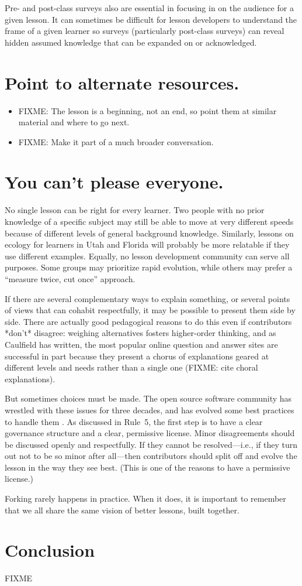 \documentclass[10pt,letterpaper]{article}
\newcommand{\rulemajor}[1]{\section{#1}}
\begin{document}
Pre- and post-class surveys also are essential in focusing in on the audience for a given lesson.
It can sometimes be difficult for lesson developers to understand the frame of a given learner
so surveys (particularly post-class surveys) can reveal hidden assumed knowledge
that can be expanded on or acknowledged.

\rulemajor{Point to alternate resources.}

\begin{itemize}

\item
  FIXME: The lesson is a beginning, not an end, so point them at similar material and where to go next.

\item
  FIXME: Make it part of a much broader conversation.

\end{itemize}

\rulemajor{You can't please everyone.}

No single lesson can be right for every learner.
Two people with no prior knowledge of a specific subject
may still be able to move at very different speeds
because of different levels of general background knowledge.
Similarly,
lessons on ecology for learners in Utah and Florida
will probably be more relatable if they use different examples.
Equally,
no lesson development community can serve all purposes.
Some groups may prioritize rapid evolution,
while others may prefer a ``measure twice, cut once'' approach.

If there are several complementary ways to explain something,
or several points of views that can cohabit respectfully,
it may be possible to present them side by side.
There are actually good pedagogical reasons to do this even if contributors *don't* disagree:
weighing alternatives fosters higher-order thinking,
and as Caulfield has written,
the most popular online question and answer sites
are successful in part because they present a chorus of explanations
geared at different levels and needs
rather than a single one (FIXME: cite choral explanations).

But sometimes choices must be made.
The open source software community has wrestled with these issues for three decades,
and has evolved some best practices to handle them
\cite{producing-oss}.
As discussed in Rule~5,
the first step is to have a clear governance structure and a clear, permissive license.
Minor disagreements should be discussed openly and respectfully.
If they cannot be resolved---i.e., if they turn out not to be so minor after all---then
contributors should split off and evolve the lesson in the way they see best.
(This is one of the reasons to have a permissive license.)

Forking rarely happens in practice.
When it does,
it is important to remember that we all share the same vision of better lessons, built together.

\section*{Conclusion}

FIXME


\end{document}
